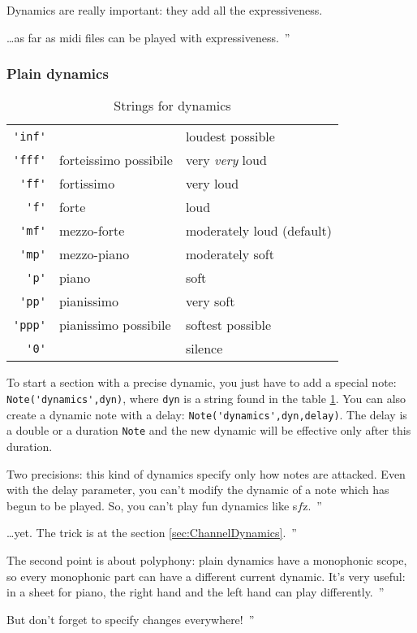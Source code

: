 \documentclass{article}
\newcommand{\note}{\lstinline!Note!\xspace}
\newcommand\sfz{s$\!f\!$z\xspace}
\newenvironment{meenv}{ \par \noindent \makebox[6em][r]{ \textcolor{mecolor}{Me}: `` --~}}{~''}
\newenvironment{myselfenv}{ \par \noindent \makebox[6em][r]{ \textcolor{myselfcolor}{Myself}: `` --~}}{~''}
\newcommand{\me}[1]{\begin{meenv}#1\end{meenv}}
\newcommand{\myself}[1]{\begin{myselfenv}#1\end{myselfenv}}
\begin{document}
Dynamics are really important: they add all the expressiveness.
\me{\dots as far as midi files can be played with expressiveness.}

\subsubsection{Plain dynamics}
\label{sec:PlainDynamics}

\begin{table}
	\centering
	\begin{tabular}{rll}
		\lstinline!'inf'! & & loudest possible \\
		\lstinline!'fff'! & forteissimo possibile & very \emph{very} loud \\
		\lstinline!'ff'! & fortissimo & very loud \\
		\lstinline!'f'! & forte & loud \\
		\lstinline!'mf'! & mezzo-forte & moderately loud (default) \\
		\lstinline!'mp'! & mezzo-piano & moderately soft \\
		\lstinline!'p'! & piano & soft \\
		\lstinline!'pp'! & pianissimo & very soft \\
		\lstinline!'ppp'! & pianissimo possibile & softest possible \\
		\lstinline!'0'! & & silence \\
	\end{tabular}
	\caption{Strings for dynamics}
	\label{tab:dynamics}
\end{table}

To start a section with a precise dynamic, you just have to add a special note: \lstinline!Note('dynamics',dyn)!, where \lstinline!dyn! is a string found in the table \ref{tab:dynamics}. You can also create a dynamic note with a delay: \lstinline!Note('dynamics',dyn,delay)!. The delay is a double or a duration \note and the new dynamic will be effective only after this duration.

\myself{Two precisions: this kind of dynamics specify only how notes are attacked. Even with the delay parameter, you can't modify the dynamic of a note which has begun to be played. So, you can't play fun dynamics like \sfz.}
\me{\dots yet. The trick is at the section \ref{sec:ChannelDynamics}.}
\myself{The second point is about polyphony: plain dynamics have a monophonic scope, so every monophonic part can have a different current dynamic. It's very useful: in a sheet for piano, the right hand and the left hand can play differently.}
\me{But don't forget to specify changes everywhere!}
\end{document}

